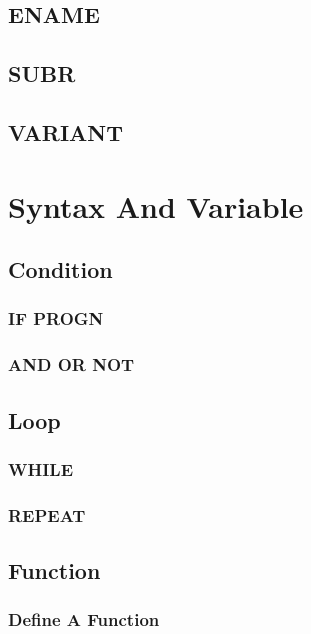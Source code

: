 \subsection{ENAME}

\subsection{SUBR}

\subsection{VARIANT}

\section{Syntax And Variable}

\subsection{Condition}

\subsubsection{IF PROGN}

\subsubsection{AND OR NOT}

\subsection{Loop}

\subsubsection{WHILE}

\subsubsection{REPEAT}

\subsection{Function}

\subsubsection{Define A Function}

